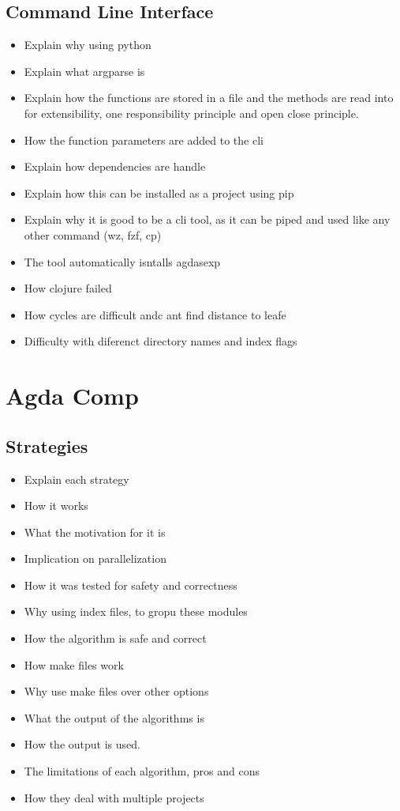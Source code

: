 \begin{itemize}
\subsection{Command Line Interface}

\begin{itemize}
\item Explain why using python
\item Explain what argparse is 
\item Explain how the functions are stored in a file and the methods are read into for extensibility, one responsibility principle and open close principle.
\item How the function parameters are added to the cli 
\item Explain how dependencies are handle 
\item Explain how this can be installed as a project using pip 
\item Explain why it is good to be a cli tool, as it can be piped and used like any other command (wz, fzf, cp) 
\item The tool automatically isntalls agdasexp 
\item How clojure failed 
\item How cycles are difficult andc ant find distance to leafe 
\item Difficulty with diferenct directory names and index flags
\end{itemize}

\section{Agda Comp}

\subsection{Strategies}

\begin{itemize}
\item Explain each strategy 
\item How it works 
\item What the motivation for it is 
\item Implication on parallelization 
\item How it was tested for safety and correctness 
\item Why using index files, to gropu these modules 
\item How the algorithm is safe and correct 
\item How make files work 
\item Why use make files over other options 
\item What the output of the algorithms is 
\item How the output is used. 
\item The limitations of each algorithm, pros and cons 
\item How they deal with multiple projects
\end{itemize}


\end{itemize}
